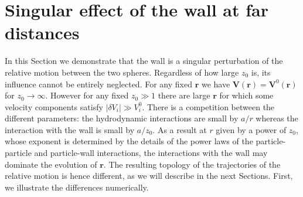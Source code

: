 \section{Singular effect of the wall at far distances}\label{singular}

In this Section we demonstrate that the wall is a singular perturbation of the relative motion between the two spheres. Regardless of how large $z_0$ is, its influence cannot be entirely neglected.
For any fixed $\bm r$ we have $\bm V(\bm r)=\bm V^0(\bm r)$ for $z_0\to\infty$. However for any fixed $z_0\gg 1$ there are large $\bm r$ for which some velocity components satisfy $|\delta V_i|\gg V^0_i$. There is a competition between the different parameters: the hydrodynamic interactions are small by $a/r$ whereas the interaction with the wall is small by $a/z_0$. As a result at $r$ given by a power of $z_0$, whose exponent is determined by the details of the power laws of the particle-particle and particle-wall interactions, the interactions with the wall may dominate the evolution of $\bm r$. The resulting topology of the trajectories of the relative motion is hence different, as we will describe in the next Sections. First, we illustrate the differences numerically.

